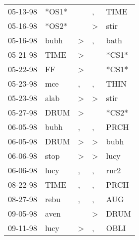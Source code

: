 \begin{supertabular}{p{0.07\textwidth}p{0.06\textwidth}p{0.02\textwidth}p{0.02\textwidth}p{0.06\textwidth}}
          05-13-98\textsuperscript{} &                   *OS1* &               &                , &  TIME\textsuperscript{} \\
          05-16-98\textsuperscript{} &                   *OS2* &               &     \textgreater &  stir\textsuperscript{} \\
          05-16-98\textsuperscript{} &  bubh\textsuperscript{} &  \textgreater &                , &  bath\textsuperscript{} \\
          05-21-98\textsuperscript{} &  TIME\textsuperscript{} &  \textgreater &                  &                   *CS1* \\
          05-22-98\textsuperscript{} &    FF\textsuperscript{} &  \textgreater &                  &                   *CS1* \\
          05-23-98\textsuperscript{} &   mce\textsuperscript{} &             , &                , &  THIN\textsuperscript{} \\
          05-23-98\textsuperscript{} &  alab\textsuperscript{} &  \textgreater &     \textgreater &  stir\textsuperscript{} \\
          05-27-98\textsuperscript{} &  DRUM\textsuperscript{} &  \textgreater &                  &                   *CS2* \\
          06-05-98\textsuperscript{} &  bubh\textsuperscript{} &             , &                , &  PRCH\textsuperscript{} \\
          06-05-98\textsuperscript{} &  DRUM\textsuperscript{} &  \textgreater &     \textgreater &  bubh\textsuperscript{} \\
          06-06-98\textsuperscript{} &  stop\textsuperscript{} &  \textgreater &     \textgreater &  lucy\textsuperscript{} \\
          06-06-98\textsuperscript{} &  lucy\textsuperscript{} &             , &                , &  rnr2\textsuperscript{} \\
          08-22-98\textsuperscript{} &  TIME\textsuperscript{} &             , &                , &  PRCH\textsuperscript{} \\
          08-27-98\textsuperscript{} &  rebu\textsuperscript{} &             , &                , &   AUG\textsuperscript{} \\
          09-05-98\textsuperscript{} &  aven\textsuperscript{} &               &     \textgreater &  DRUM\textsuperscript{} \\
          09-11-98\textsuperscript{} &  lucy\textsuperscript{} &  \textgreater &                , &  OBLI\textsuperscript{} \\

\end{supertabular}
